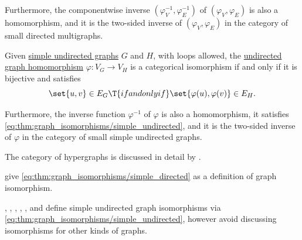 \begin{proposition}
\begin{thmenum}
    Furthermore, the componentwise inverse \( (\varphi_V^{-1}, \varphi_E^{-1}) \) of \( (\varphi_V, \varphi_E) \) is also a homomorphism, and it is the two-sided inverse of \( (\varphi_V, \varphi_E) \) in the category of small directed multigraphs.

     Given \hyperref[def:undirected_graph]{simple undirected graphs} \( G \) and \( H \), with loops allowed, the \hyperref[def:undirected_graph/morphism]{undirected graph homomorphism} \( \varphi: V_G \to V_H \) is a categorical isomorphism if and only if it is bijective and satisfies
    \begin{equation}\label{eq:thm:graph_isomorphisms/simple_undirected}
      \set{ u, v } \in E_G \T{if and only if} \set{ \varphi(u), \varphi(v) } \in E_H.
    \end{equation}
  \end{thmenum}

  Furthermore, the inverse function \( \varphi^{-1} \) of \( \varphi \) is also a homomorphism, it satisfies \eqref{eq:thm:graph_isomorphisms/simple_undirected}, and it is the two-sided inverse of \( \varphi \) in the category of small simple undirected graphs.
\end{proposition}
\begin{comments}
  \item The category of hypergraphs is discussed in detail by \textcite{DörflerWaller1980Hypergraphs}.

  \textcite[def. 1.4.1]{Knauer2019AlgebraicGraphTheory} give \eqref{eq:thm:graph_isomorphisms/simple_directed} as a definition of graph isomorphism.

  \textcite[3]{Diestel2017GraphTheory}, \textcite[3]{Bollobás1998ModernGraphTheory}, \textcite[def. 1.4.3]{Knauer2019AlgebraicGraphTheory}, \textcite[def. 10.3.1]{Rosen2019DiscreteMathematics}, \textcite[13]{ЕмеличевИПр1990ТеорияГрафов}, \textcite[def. 5.14]{БелоусовТкачёв2004ДискретнаяМатематика} and \textcite[\S 7.1.6]{Новиков2013ДискретнаяМатематика} define simple undirected graph isomorphisms via \eqref{eq:thm:graph_isomorphisms/simple_undirected}, however avoid discussing isomorphisms for other kinds of graphs.
\end{comments}
